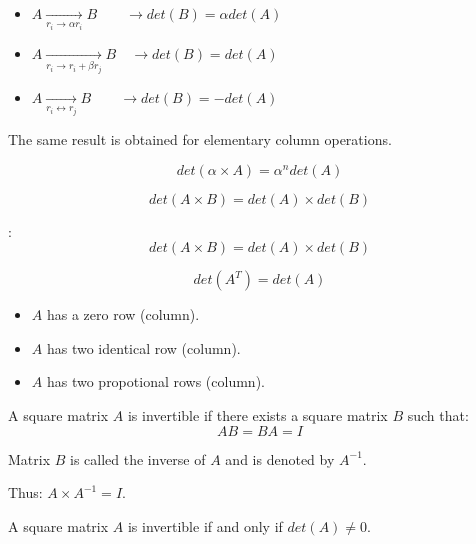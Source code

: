       \begin{itemize}
        \item $A \xrightarrow[r_{i} \to \alpha r_{i}]{} B \quad \quad
          \rightarrow det(B) = \alpha det(A)$
        \item $A \xrightarrow[r_{i} \to r_{i} + \beta r_{j}]{} B \quad
          \rightarrow det(B) = det(A)$
        \item $A \xrightarrow[r_{i} \leftrightarrow r_{j}]{} B \quad \quad
          \rightarrow det(B) = - det(A)$
      \end{itemize}
      \par The same result is obtained for elementary column operations.

      \[
        det(\alpha \times A) = \alpha^{n} det(A)
      \]

      \[
        det(A \times B) = det(A) \times det(B)
      \]
      \par {}:
      \[
        det(A \times B) = det(A) \times det(B)
      \]

      \[
        det(A^{T}) = det(A)
      \]

      \begin{itemize}
        \item $A$ has a zero row (column).
        \item $A$ has two identical row (column).
        \item $A$ has two propotional rows (column).
      \end{itemize}

  \hiiEND


    \par A square matrix $A$ is invertible if there exists a square matrix $B$
    such that:
    \[
      AB = BA = I
    \]

    \par Matrix $B$ is called the inverse of $A$ and is denoted by $A^{-1}$.
    \par Thus: $A \times A^{-1} = I$.

    \par A square matrix $A$ is invertible if and only if $det(A) \neq 0$.

